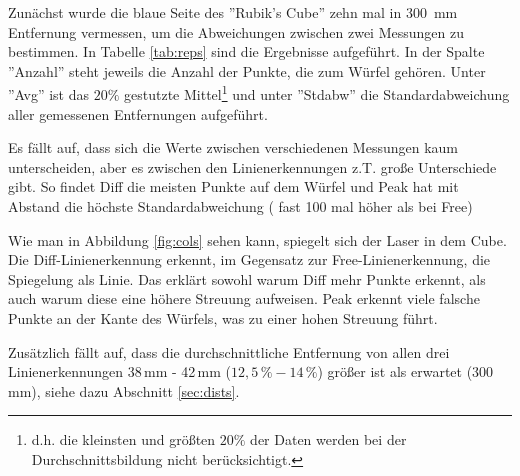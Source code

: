 \documentclass[ngerman,a4paper,parskip=half]{scrartcl}
\begin{document}
Zunächst wurde die blaue Seite des ''Rubik's Cube'' zehn mal in 300~mm Entfernung vermessen, um die Abweichungen zwischen zwei Messungen zu bestimmen. In Tabelle \ref{tab:reps} sind die Ergebnisse aufgeführt. In der Spalte ''Anzahl'' steht jeweils die Anzahl der Punkte, die zum Würfel gehören. Unter ''Avg'' ist das $20 \%$ gestutzte Mittel\footnote{d.h. die kleinsten und größten $20 \%$ der Daten werden bei der Durchschnittsbildung nicht berücksichtigt.} und unter ''Stdabw'' die Standardabweichung aller gemessenen Entfernungen aufgeführt.

Es fällt auf, dass sich die Werte zwischen verschiedenen Messungen kaum unterscheiden, aber es zwischen den Linienerkennungen z.T. große Unterschiede gibt. So findet Diff die meisten Punkte auf dem Würfel und Peak hat mit Abstand die höchste Standardabweichung ( fast 100 mal höher als bei Free)

Wie man in Abbildung \ref{fig:cols} sehen kann, spiegelt sich der Laser in dem Cube. Die Diff-Linienerkennung erkennt, im Gegensatz zur Free-Linienerkennung, die Spiegelung als Linie. Das erklärt sowohl warum Diff mehr Punkte erkennt, als auch warum diese eine höhere Streuung aufweisen.
Peak erkennt viele falsche Punkte an der Kante des Würfels, was zu einer hohen Streuung führt.

Zusätzlich fällt auf, dass die durchschnittliche Entfernung von allen drei Linienerkennungen 38\,mm - 42\,mm ($12,5\,\%-14\,\%$) größer ist als erwartet (300\,mm), siehe dazu Abschnitt \ref{sec:dists}.
\end{document}
